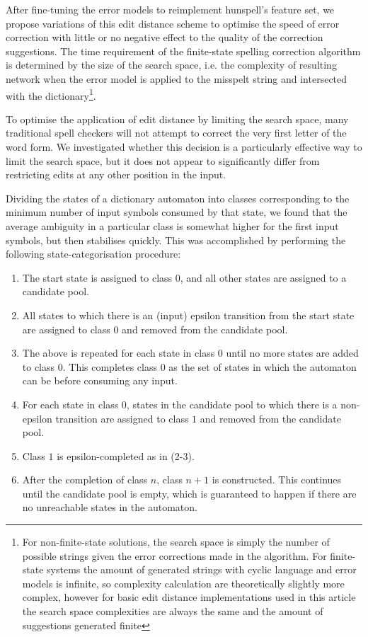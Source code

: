 \documentclass[11pt]{article}
\begin{document}
After fine-tuning the error models to reimplement hunspell's feature set, we
propose variations of this edit distance scheme to optimise the
speed of error correction with little or no negative effect to the quality of
the correction suggestions. The time requirement of the
finite-state spelling correction algorithm is determined by the size of the
search space,
i.e. the complexity of resulting network when the error model is applied to the
misspelt string and intersected with the dictionary\footnote{For non-finite-state
solutions, the search space is simply the number of
possible strings given the error corrections made in the algorithm. For
finite-state systems the amount of generated strings with cyclic language and
error models is infinite, so complexity calculation are theoretically slightly
more complex, however for basic edit distance implementations used in this
article the search space complexities are always the same and the amount of
suggestions generated finite}.

To optimise the application of edit distance by limiting the search space, many
traditional spell checkers will not attempt to correct the very first letter of
the word form. We investigated whether this decision is a particularly
effective way to limit the search space, but it does not appear to
significantly differ from restricting edits at any other position in the input.

Dividing the states of a dictionary automaton into classes corresponding to
the minimum number of input symbols consumed by that state, we found that
the average ambiguity in a particular class is somewhat higher for the first
input symbols, but then stabilises quickly. This was accomplished by
performing the following
state-categorisation procedure:

\begin{enumerate}
\item The start state is assigned to class $0$, and all other states are
assigned to a candidate pool.
\item All states to which there is an (input) epsilon transition from the
start state are assigned to class $0$ and removed from the candidate pool.
\item The above is repeated for each state in class $0$ until no more states
are added to class $0$. This completes class $0$ as the set of states in which
the automaton can be before consuming any input.
\item For each state in class $0$, states in the candidate pool to which there
is a non-epsilon transition are assigned to class $1$ and removed from the
candidate pool.
\item Class $1$ is epsilon-completed as in (2-3).
\item After the completion of class $n$, class $n+1$ is constructed. This
continues until the candidate pool is empty, which is guaranteed to happen
if there are no unreachable states in the automaton.
\end{enumerate}
\end{document}
